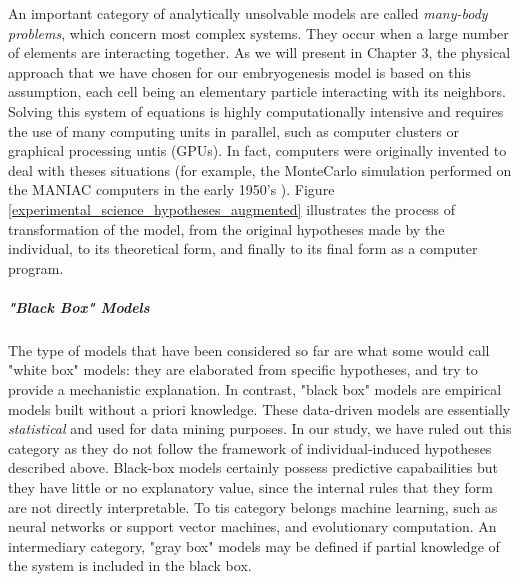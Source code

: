 An important category of analytically unsolvable models are called \textit{many-body problems}, which concern most complex systems. They occur when a large number of elements are interacting together. As we will present in Chapter 3, the physical approach that we have chosen for our embryogenesis model is based on this assumption, each cell being an elementary particle interacting with its neighbors. Solving this system of equations is highly computationally intensive and requires the use of many computing units in parallel, such as computer clusters or graphical processing untis (GPUs). In fact, computers were originally invented to deal with theses situations (for example, the MonteCarlo simulation performed on the MANIAC computers in the early 1950's \cite{Metropolis:1987ws}). Figure \ref{experimental_science_hypotheses_augmented} illustrates the process of transformation of the model, from the original hypotheses made by the individual, to its theoretical form, and finally to its final form as a computer program.

\subparagraph{"Black Box" Models}


The type of models that have been considered so far are what some would call "white box" models: they are elaborated from specific hypotheses, and try to provide a mechanistic explanation. In contrast, "black box" models are empirical models built without a priori knowledge. These data-driven models are essentially \textit{statistical} and used for data mining purposes. In our study, we have ruled out this category as they do not follow the framework of individual-induced hypotheses described above. Black-box models certainly possess predictive capabailities but they have little or no explanatory value, since the internal rules that they form are not directly interpretable. To tis category belongs machine learning, such as neural networks or support vector machines, and evolutionary computation. An intermediary category, "gray box" models may be defined if partial knowledge of the system is included in the black box.

